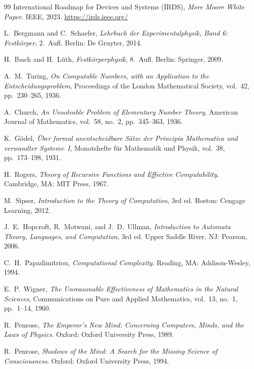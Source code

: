 ﻿\documentclass[12pt, a4paper]{article}
\begin{document}
\begin{thebibliography}{99}
		International Roadmap for Devices and Systems (IRDS),
		\textit{More Moore White Paper}.
		IEEE, 2023. \url{https://irds.ieee.org/}
		
		L.~Bergmann and C.~Schaefer,
		\textit{Lehrbuch der Experimentalphysik, Band 6: Festk\"{o}rper}, 2.~Aufl.
		Berlin: De Gruyter, 2014.
		
		H.~Ibach and H.~L\"{u}th,
		\textit{Festk\"{o}rperphysik}, 8.~Aufl.
		Berlin: Springer, 2009.

		A.~M.~Turing,
		\textit{On Computable Numbers, with an Application to the Entscheidungsproblem},
		Proceedings of the London Mathematical Society, vol.~42, pp.~230--265, 1936.

		A.~Church,
		\textit{An Unsolvable Problem of Elementary Number Theory},
		American Journal of Mathematics, vol.~58, no.~2, pp.~345--363, 1936.

		K.~G\"{o}del,
		\textit{\"{U}ber formal unentscheidbare S\"{a}tze der Principia Mathematica und verwandter Systeme~I},
		Monatshefte f\"{u}r Mathematik und Physik, vol.~38, pp.~173--198, 1931.

		H.~Rogers,
		\textit{Theory of Recursive Functions and Effective Computability}.
		Cambridge, MA: MIT Press, 1967.

		M.~Sipser,
		\textit{Introduction to the Theory of Computation}, 3rd ed.
		Boston: Cengage Learning, 2012.

		J.~E.~Hopcroft, R.~Motwani, and J.~D.~Ullman,
		\textit{Introduction to Automata Theory, Languages, and Computation}, 3rd ed.
		Upper Saddle River, NJ: Pearson, 2006.

		C.~H.~Papadimitriou,
		\textit{Computational Complexity}.
		Reading, MA: Addison-Wesley, 1994.

		E.~P.~Wigner,
		\textit{The Unreasonable Effectiveness of Mathematics in the Natural Sciences},
		Communications on Pure and Applied Mathematics, vol.~13, no.~1, pp.~1--14, 1960.

		R.~Penrose,
		\textit{The Emperor's New Mind: Concerning Computers, Minds, and the Laws of Physics}.
		Oxford: Oxford University Press, 1989.

		R.~Penrose,
		\textit{Shadows of the Mind: A Search for the Missing Science of Consciousness}.
		Oxford: Oxford University Press, 1994.


\end{thebibliography}
\end{document}
